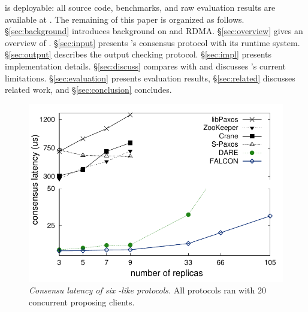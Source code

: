\xxx is deployable: all source code, benchmarks, and raw evaluation results are 
available at \github. The remaining of this paper is organized as follows.
\S\ref{sec:background} introduces background on \paxos and RDMA.
\S\ref{sec:overview} gives an overview of \xxx. \S\ref{sec:input} presents 
\xxx's consensus protocol with its runtime system. \S\ref{sec:output} describes 
the output checking protocol. \S\ref{sec:impl} presents implementation 
details. \S\ref{sec:discuss} compares \dare with \xxx and discusses \xxx's 
current limitations. \S\ref{sec:evaluation} presents evaluation results, 
\S\ref{sec:related} discusses related work, and \S\ref{sec:conclusion} 
concludes. 

\begin{figure}[t]
\centering
\vspace{-.10in}
\includegraphics[width=.4\textwidth]{figures/traditional_paxos_latency}
\vspace{-.15in}
\caption{{\em Consensu latency of six \paxos-like protocols.} All protocols ran 
with 20 concurrent proposing clients.}
\label{fig:scalability}
\vspace{-.20in}
\end{figure}
